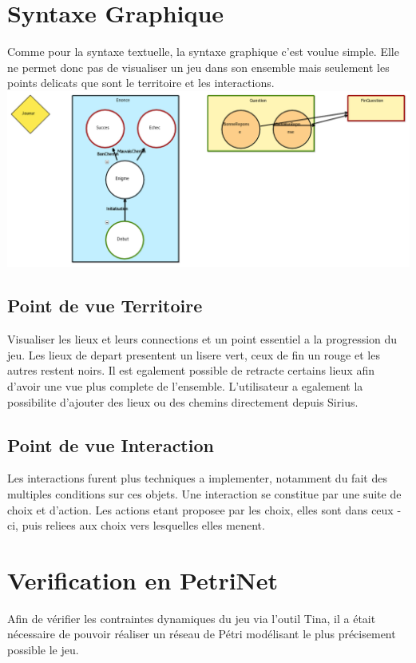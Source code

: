 \documentclass[12pt]{article}
\begin{document}
\section{Syntaxe Graphique}
Comme pour la syntaxe textuelle, la syntaxe graphique c'est voulue simple. Elle ne permet donc pas de visualiser un jeu dans son ensemble mais seulement les points delicats que sont le territoire et les interactions.
\newline\newline
\includegraphics[width=\textwidth]{images/diagram_JeuEnigme}
\newline\newline

\subsection{Point de vue Territoire}
Visualiser les lieux et leurs connections et un point essentiel a la progression du jeu. Les lieux de depart presentent un lisere vert, ceux de fin un rouge et les autres restent noirs. Il est egalement possible de retracte certains lieux afin d'avoir une vue plus complete de l'ensemble. L'utilisateur a egalement la possibilite d'ajouter des lieux ou des chemins directement depuis Sirius.

\subsection{Point de vue Interaction}
Les interactions furent plus techniques a implementer, notamment du fait des multiples conditions sur ces objets. Une interaction se constitue par une suite de choix et d'action. Les actions etant proposee par les choix, elles sont dans ceux -ci, puis reliees aux choix vers lesquelles elles menent.

\section{Verification en PetriNet}
Afin de vérifier les contraintes dynamiques du jeu via l'outil Tina, il a était nécessaire de pouvoir réaliser un réseau de Pétri modélisant le plus précisement possible le jeu.
\end{document}
